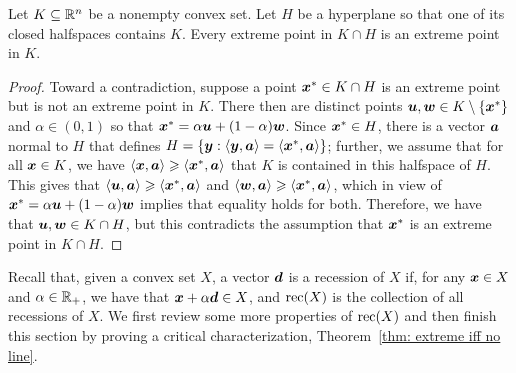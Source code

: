 \begin{theorem}\label{thm: extreme remains extreme} Let $K\subseteq \mathbb R^{n}$ be a nonempty convex set. Let $H$ be a hyperplane so that one of its closed halfspaces contains $K$. Every extreme point in $K\cap H$ is an extreme point in $K$. 
\end{theorem}
\begin{proof}
Toward a contradiction, suppose a point ${\boldsymbol x}^\ast\in K\cap H$ is an extreme point but is not an extreme point in $K$. There then are distinct points ${\boldsymbol u}, {\boldsymbol w} \in K\setminus\{{\boldsymbol x}^\ast\}$ and $\alpha\in (0, 1)$ so that ${\boldsymbol x}^\ast = \alpha{\boldsymbol u} + (1-\alpha){\boldsymbol w}$. Since ${\boldsymbol x}^\ast\in H$, there is a vector ${\boldsymbol a}$ normal to $H$ that defines $H = \{{\boldsymbol y}: \left\langle{\boldsymbol y}, {\boldsymbol a}\right\rangle =  \left\langle{\boldsymbol x}^\ast, {\boldsymbol a}\right\rangle\}$; further, we assume that for all ${\boldsymbol x}\in K$, we have $\left\langle{\boldsymbol x}, {\boldsymbol a}\right\rangle\geqslant \left\langle{\boldsymbol x}^\ast, {\boldsymbol a}\right\rangle$ that $K$ is contained in this halfspace of $H$. This gives that  $\left\langle{\boldsymbol u}, {\boldsymbol a}\right\rangle\geqslant \left\langle{\boldsymbol x}^\ast, {\boldsymbol a}\right\rangle$ and $\left\langle{\boldsymbol w}, {\boldsymbol a}\right\rangle\geqslant \left\langle{\boldsymbol x}^\ast, {\boldsymbol a}\right\rangle$, which in view of ${\boldsymbol x}^\ast = \alpha{\boldsymbol u} + (1-\alpha){\boldsymbol w}$ implies that equality holds for both. Therefore, we have that ${\boldsymbol u}, {\boldsymbol w}\in K\cap H$, but this contradicts the assumption that ${\boldsymbol x}^\ast$ is an extreme point in $K\cap H$. 
\end{proof}



Recall that, given a convex set $X$, a vector ${\boldsymbol d}$ is a recession of $X$ if, for any ${\boldsymbol x}\in X$ and $\alpha\in\mathbb R_+$, we have that ${\boldsymbol x} + \alpha{\boldsymbol d} \in X$, and $\operatorname{rec}(X)$ is the collection of all recessions of $X$. We first review some more properties of $\operatorname{rec}(X)$ and then finish this section by proving a critical characterization, Theorem~\ref{thm: extreme iff no line}. 


